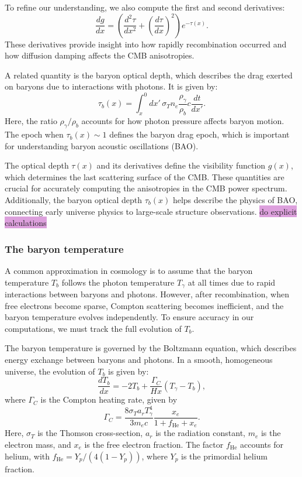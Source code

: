 \documentclass{aa}
\begin{document}
To refine our understanding, we also compute the first and second derivatives:
\begin{equation}
\frac{dg}{dx} = \left( \frac{d^2\tau}{dx^2} + \left(\frac{d\tau}{dx}\right)^2 \right) e^{-\tau(x)}.
\end{equation}
These derivatives provide insight into how rapidly recombination occurred and how diffusion damping affects the CMB anisotropies.

A related quantity is the baryon optical depth, which describes the drag exerted on baryons due to interactions with photons. It is given by:
\begin{equation}
\tau_b(x) = \int_x^0 dx' \, \sigma_T n_e \frac{\rho_\gamma}{\rho_b} c \frac{dt}{dx'}.
\end{equation}
Here, the ratio $\rho_\gamma / \rho_b$ accounts for how photon pressure affects baryon motion. The epoch when $\tau_b(x) \sim 1$ defines the baryon drag epoch, which is important for understanding baryon acoustic oscillations (BAO).

The optical depth $\tau(x)$ and its derivatives define the visibility function $g(x)$, which determines the last scattering surface of the CMB. These quantities are crucial for accurately computing the anisotropies in the CMB power spectrum. Additionally, the baryon optical depth $\tau_b(x)$ helps describe the physics of BAO, connecting early universe physics to large-scale structure observations.
\color{black}
\colorbox{Plum}{do explicit calculations}








\subsubsection{The baryon temperature}
\color{Plum}
A common approximation in cosmology is to assume that the baryon temperature $T_b$ follows the photon temperature $T_\gamma$ at all times due to rapid interactions between baryons and photons. However, after recombination, when free electrons become sparse, Compton scattering becomes inefficient, and the baryon temperature evolves independently. To ensure accuracy in our computations, we must track the full evolution of $T_b$.

The baryon temperature is governed by the Boltzmann equation, which describes energy exchange between baryons and photons. In a smooth, homogeneous universe, the evolution of $T_b$ is given by:
\begin{equation}
\frac{dT_b}{dx} = -2 T_b + \frac{\Gamma_C}{H x} (T_\gamma - T_b),
\end{equation}
where $\Gamma_C$ is the Compton heating rate, given by
\begin{equation}
\Gamma_C = \frac{8 \sigma_T a_r T_\gamma^4}{3 m_e c} \frac{x_e}{1 + f_{\text{He}} + x_e}.
\end{equation}
Here, $\sigma_T$ is the Thomson cross-section, $a_r$ is the radiation constant, $m_e$ is the electron mass, and $x_e$ is the free electron fraction. The factor $f_{\text{He}}$ accounts for helium, with $f_{\text{He}} = Y_p / (4 (1 - Y_p))$, where $Y_p$ is the primordial helium fraction.
\end{document}
